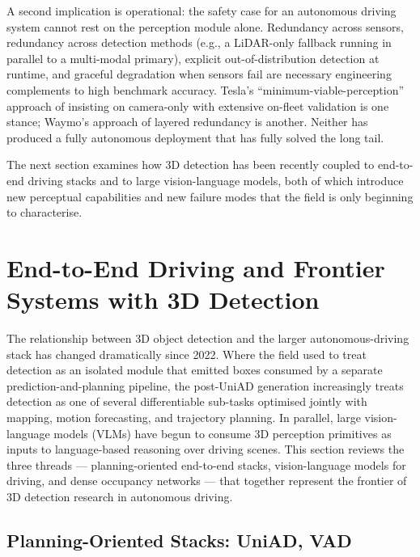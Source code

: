 \documentclass{article}
\begin{document}
A second implication is operational: the safety case for an autonomous driving system cannot rest on the perception module alone. Redundancy across sensors, redundancy across detection methods (e.g., a LiDAR-only fallback running in parallel to a multi-modal primary), explicit out-of-distribution detection at runtime, and graceful degradation when sensors fail are necessary engineering complements to high benchmark accuracy. Tesla's ``minimum-viable-perception'' approach of insisting on camera-only with extensive on-fleet validation is one stance; Waymo's approach of layered redundancy is another. Neither has produced a fully autonomous deployment that has fully solved the long tail.

The next section examines how 3D detection has been recently coupled to end-to-end driving stacks and to large vision-language models, both of which introduce new perceptual capabilities and new failure modes that the field is only beginning to characterise.
\section{End-to-End Driving and Frontier Systems with 3D Detection}\label{sec:end-to-end-driving-and-frontier-systems-with-3d-detection}
The relationship between 3D object detection and the larger autonomous-driving stack has changed dramatically since 2022. Where the field used to treat detection as an isolated module that emitted boxes consumed by a separate prediction-and-planning pipeline, the post-UniAD generation increasingly treats detection as one of several differentiable sub-tasks optimised jointly with mapping, motion forecasting, and trajectory planning. In parallel, large vision-language models (VLMs) have begun to consume 3D perception primitives as inputs to language-based reasoning over driving scenes. This section reviews the three threads --- planning-oriented end-to-end stacks, vision-language models for driving, and dense occupancy networks --- that together represent the frontier of 3D detection research in autonomous driving.

\subsection{Planning-Oriented Stacks: UniAD, VAD}\label{planning-oriented-stacks-uniad-vad}
\end{document}
